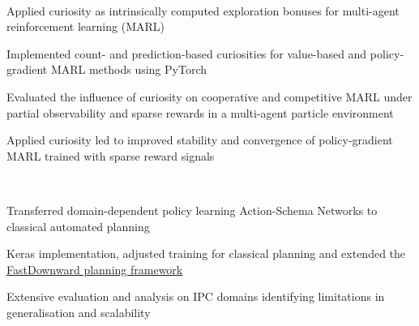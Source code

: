 \documentclass[]{lukas-cv-openfont}
\begin{document}
\noindent
{}
\\
\begin{tightitemize}{1.7em}
    \item Applied curiosity as intrinsically computed exploration bonuses for multi-agent reinforcement learning (MARL)
    \item Implemented count- and prediction-based curiosities for value-based and policy-gradient MARL methods using PyTorch
    \item Evaluated the influence of curiosity on cooperative and competitive MARL under partial observability and sparse rewards in a multi-agent particle environment
    \item Applied curiosity led to improved stability and convergence of policy-gradient MARL trained with sparse reward signals
\end{tightitemize}
\largesectionsep


\noindent
{}
\\
\begin{tightitemize}{1.7em}
    \item Transferred domain-dependent policy learning Action-Schema Networks to
    classical automated planning
    \item Keras implementation, adjusted training for classical planning and extended the \href{http://www.fast-downward.org}{FastDownward planning framework}
    \item Extensive evaluation and analysis on IPC domains identifying limitations in generalisation and scalability
\end{tightitemize}
\largesectionsep
\end{document}
